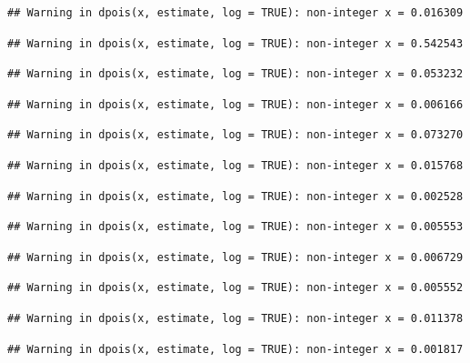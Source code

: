 \documentclass[]{article}
\begin{document}
\begin{verbatim}
## Warning in dpois(x, estimate, log = TRUE): non-integer x = 0.016309
\end{verbatim}

\begin{verbatim}
## Warning in dpois(x, estimate, log = TRUE): non-integer x = 0.542543
\end{verbatim}

\begin{verbatim}
## Warning in dpois(x, estimate, log = TRUE): non-integer x = 0.053232
\end{verbatim}

\begin{verbatim}
## Warning in dpois(x, estimate, log = TRUE): non-integer x = 0.006166
\end{verbatim}

\begin{verbatim}
## Warning in dpois(x, estimate, log = TRUE): non-integer x = 0.073270
\end{verbatim}

\begin{verbatim}
## Warning in dpois(x, estimate, log = TRUE): non-integer x = 0.015768
\end{verbatim}

\begin{verbatim}
## Warning in dpois(x, estimate, log = TRUE): non-integer x = 0.002528
\end{verbatim}

\begin{verbatim}
## Warning in dpois(x, estimate, log = TRUE): non-integer x = 0.005553
\end{verbatim}

\begin{verbatim}
## Warning in dpois(x, estimate, log = TRUE): non-integer x = 0.006729
\end{verbatim}

\begin{verbatim}
## Warning in dpois(x, estimate, log = TRUE): non-integer x = 0.005552
\end{verbatim}

\begin{verbatim}
## Warning in dpois(x, estimate, log = TRUE): non-integer x = 0.011378
\end{verbatim}

\begin{verbatim}
## Warning in dpois(x, estimate, log = TRUE): non-integer x = 0.001817
\end{verbatim}
\end{document}
